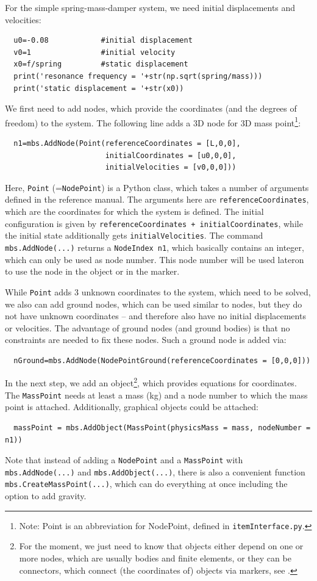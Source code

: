 %
For the simple spring-mass-damper system, we need initial displacements and velocities:
\pythonstyle\begin{lstlisting}
  u0=-0.08            #initial displacement
  v0=1                #initial velocity
  x0=f/spring         #static displacement
  print('resonance frequency = '+str(np.sqrt(spring/mass)))
  print('static displacement = '+str(x0))
\end{lstlisting}
%
We first need to add nodes, which provide the coordinates (and the degrees of freedom) to the system.
The following line adds a 3D node for 3D mass point\footnote{Note: Point is an abbreviation for NodePoint, defined in \texttt{itemInterface.py}.}:
\pythonstyle\begin{lstlisting}
  n1=mbs.AddNode(Point(referenceCoordinates = [L,0,0], 
                       initialCoordinates = [u0,0,0], 
                       initialVelocities = [v0,0,0]))
\end{lstlisting}
Here, \texttt{Point} (=\texttt{NodePoint}) is a Python class, which takes a number of arguments defined in the reference manual. The arguments here are \texttt{referenceCoordinates}, which are the coordinates for which the system is defined. The initial configuration is given by \texttt{referenceCoordinates + initialCoordinates}, while the initial state additionally gets \texttt{initialVelocities}.
The command \texttt{mbs.AddNode(...)} returns a \texttt{NodeIndex n1}, which basically contains an integer, which can only be used as node number. This node number will be used lateron to use the node in the object or in the marker.

%
While \texttt{Point} adds 3 unknown coordinates to the system, which need to be solved, we also can add ground nodes, which can be used similar to nodes, but they do not have unknown coordinates -- and therefore also have no initial displacements or velocities. The advantage of ground nodes (and ground bodies) is that no constraints are needed to fix these nodes.
%
Such a ground node is added via:
\pythonstyle\begin{lstlisting}
  nGround=mbs.AddNode(NodePointGround(referenceCoordinates = [0,0,0]))
\end{lstlisting}
%
In the next step, we add an object\footnote{For the moment, we just need to know that objects either depend on one or more nodes, which are usually bodies and finite elements, or they can be connectors, which connect (the coordinates of) objects via markers, see .}, which provides equations for coordinates. The \texttt{MassPoint} needs at least a mass (kg) and a node number to which the mass point is attached. Additionally, graphical objects could be attached:
\pythonstyle\begin{lstlisting}
  massPoint = mbs.AddObject(MassPoint(physicsMass = mass, nodeNumber = n1))
\end{lstlisting}
Note that instead of adding a \texttt{NodePoint} and a \texttt{MassPoint} with \texttt{mbs.AddNode(...)}
and \texttt{mbs.AddObject(...)}, there is also a convenient function \texttt{mbs.CreateMassPoint(...)}, which can do everything at once including the option to add gravity.

